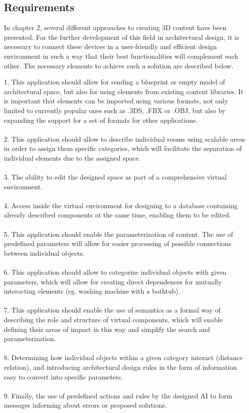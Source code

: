 \documentclass[runningheads]{llncs}
\begin{document}
\subsection{Requirements}
In chapter 2, several different approaches to creating 3D content have been presented. For the further development of this field in architectural design, it is necessary to connect these devices in a user-friendly and efficient design environment in such a way that their best functionalities will complement each other. The necessary elements to achieve such a solution are described below.\\

\begin{addmargin}[1em]{2em}%
1.	This application should allow for sending a blueprint or empty model of architectural space, but also for using elements from existing content libraries. It is important that elements can be imported using various formats, not only limited to currently popular ones such as .3DS, .FBX or .OBJ, but also by expanding the support for a set of formats for other applications.\\
\\
2.	This application should allow to describe individual rooms using scalable areas in order to assign them specific categories, which will facilitate the separation of individual elements due to the assigned space.\\
\\
3.	The ability to edit the designed space as part of a comprehensive virtual environment.\\
\\
4.	Access inside the virtual environment for designing to a database containing already described components at the same time, enabling them to be edited.\\
\\
5.	This application should enable the parameterization of content. The use of predefined parameters will allow for easier processing of possible connections between individual objects.\\
\\
6.	This application should allow to categorize individual objects with given parameters, which will allow for creating direct dependences for mutually interacting elements (eg. washing machine with a bathtub).\\
\\
7.	This application should enable the use of semantics as a formal way of describing the role and structure of virtual components, which will enable defining their areas of impact in this way and simplify the search and parameterization.\\
\\
8.	Determining how individual objects within a given category interact (distance relation), and introducing architectural design rules in the form of information easy to convert into specific parameters.\\
\\
9.  	Finally, the use of predefined actions and rules by the designed AI to form messages informing about errors or proposed solutions.\\
\end{addmargin}
\end{document}

